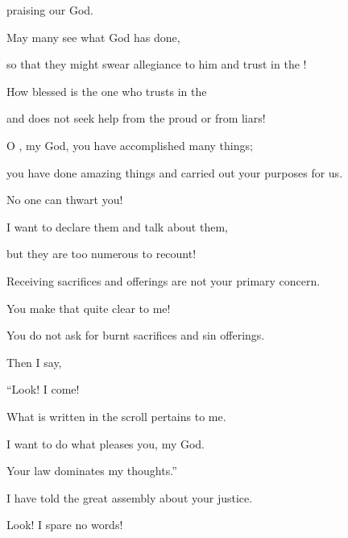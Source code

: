 {\par }{\Q praising
our God.
\par }{\Q May many
see
what
God has done,
\par }{\Q so that they might
swear allegiance to him and trust
in the
{}!
\par }{\Q {}How blessed
is the one
who
trusts
in the
{}

\par }{\Q and does not
seek help
from
the proud
or from liars!
\par }{\Q {}O
{}, my God,
you have
accomplished
many
things;
\par }{\Q you
have done amazing
things and carried out
your purposes for us.
\par }{\Q No one can
thwart you!

\par }{\Q I want to declare them
and talk about them,
\par }{\Q but they
are too
numerous to recount!
\par }{\Q {}Receiving sacrifices
and offerings
are not
your primary
concern.

\par }{\Q You make that quite clear to me!

\par }{\Q You do not
ask
for burnt sacrifices and sin offerings.
\par }{\Q {}Then
I say,
\par }{\Q “Look! I come!
\par }{\Q What is written
in the scroll
pertains to me.
\par }{\Q {}I want
to do
what pleases
you, my God.
\par }{\Q Your law
dominates my thoughts.”
\par }{\Q {}I have told
the great
assembly
about your justice.
\par }{\Q Look! I spare
no
words!

}
